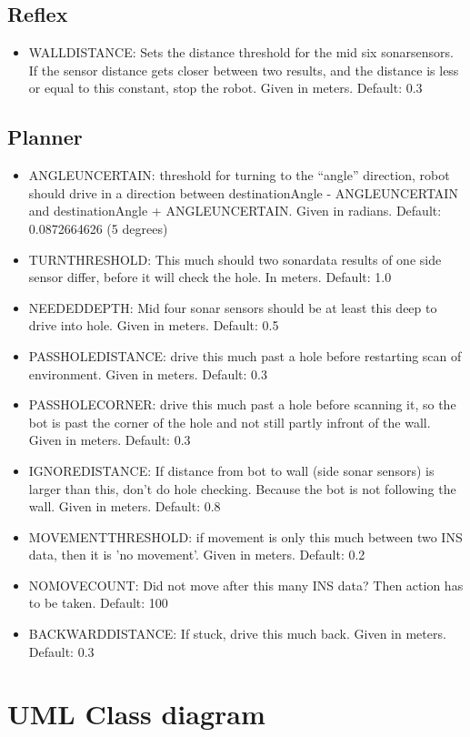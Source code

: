 \documentclass[titlepage, a4paper,10pt]{article}
\begin{document}
\subsection{Reflex}
\begin{itemize}
\item WALLDISTANCE: Sets the distance threshold for the mid six sonarsensors. If the sensor distance gets closer between two results, and the distance is less or equal to this constant, stop the robot. Given in meters. Default: 0.3
\end{itemize}

\subsection{Planner}
\begin{itemize}
\item ANGLEUNCERTAIN: threshold for turning to the ``angle'' direction, robot should drive in a direction between destinationAngle - ANGLEUNCERTAIN and destinationAngle + ANGLEUNCERTAIN. Given in radians. Default: 0.0872664626 (5 degrees)

\item TURNTHRESHOLD: This much should two sonardata results of one side sensor differ, before it will check the hole. In meters. Default: 1.0 

\item NEEDEDDEPTH: Mid four sonar sensors should be at least this deep to drive into hole. Given in meters. Default: 0.5

\item PASSHOLEDISTANCE: drive this much past a hole before restarting scan of environment. Given in meters. Default: 0.3

\item PASSHOLECORNER: drive this much past a hole before scanning it, so the bot is past the corner of the hole and not still partly infront of the wall. Given in meters. Default: 0.3

\item IGNOREDISTANCE: If distance from bot to wall (side sonar sensors) is larger than this, don't do hole checking. Because the bot is not following the wall. Given in meters. Default: 0.8

\item MOVEMENTTHRESHOLD: if movement is only this much between two INS data, then it is 'no movement'. Given in meters. Default: 0.2

\item NOMOVECOUNT: Did not move after this many INS data? Then action has to be taken. Default: 100

\item BACKWARDDISTANCE: If stuck, drive this much back. Given in meters. Default: 0.3

\end{itemize}
\section{UML Class diagram}

\end{document}
